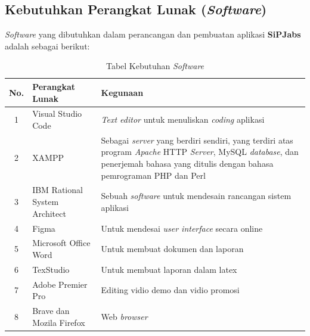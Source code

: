 \newpage
\subsection{Kebutuhkan Perangkat Lunak (\textit{Software})}

\textit{Software} yang dibutuhkan dalam perancangan dan pembuatan aplikasi \textbf{SiPJabs}
adalah sebagai berikut:

\begin{table}[H]
	\centering
	\caption{Tabel Kebutuhan \textit{Software}}
	\begin{tabular}{ | c | l | p{64.5mm} | }
		\hline
		No. & Perangkat Lunak & Kegunaan \\
		\hline
		
		1 & Visual Studio Code & \textit{Text editor} untuk menuliskan \textit{coding} aplikasi \\
				
		\hline
		
		2 & XAMPP & Sebagai \textit{server} yang berdiri sendiri, yang terdiri atas program \textit{Apache} HTTP \textit{Server}, MySQL \textit{database}, dan penerjemah bahasa yang ditulis dengan bahasa pemrograman PHP dan Perl \\
		
		\hline
		
		3 & IBM Rational System Architect  & Sebuah \textit{software} untuk mendesain rancangan sistem aplikasi \\
		
		\hline
		
		4 & Figma & Untuk mendesai \textit{user interface} secara online \\
		
		
		\hline
		
		5 & Microsoft Office Word & Untuk membuat dokumen dan laporan \\
		
		\hline
		
		6 & TexStudio & Untuk membuat laporan dalam latex \\
		
		\hline
		
		7 & Adobe Premier Pro & Editing vidio demo dan vidio promosi \\
		
		\hline
		
		8 & Brave dan Mozila Firefox & Web \textit{browser} \\
		
		\hline
	\end{tabular}
\end{table}

